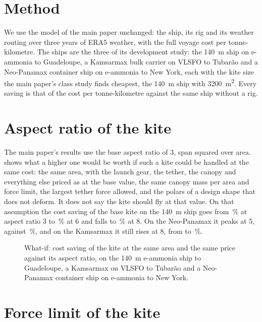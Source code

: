\documentclass[3p,times,authoryear]{elsarticle}
\begin{document}
\section{Method}
\label{sec:method}

We use the model of the main paper unchanged: the ship, its rig and its weather routing over three years of ERA5 weather, with the full voyage cost per tonne-kilometre. The ships are the three of its development study: the \SI{140}{m} ship on e-ammonia to Guadeloupe, a Kamsarmax bulk carrier on VLSFO to Tubarão and a Neo-Panamax container ship on e-ammonia to New York, each with the kite size the main paper's class study finds cheapest, the \SI{140}{m} ship with \SI{3200}{m^2}. Every saving is that of the cost per tonne-kilometre against the same ship without a rig.

\section{Aspect ratio of the kite}
\label{sec:aspect}

The main paper's results use the base aspect ratio of 3, span squared over area.  shows what a higher one would be worth if such a kite could be handled at the same cost: the same area, with the launch gear, the tether, the canopy and everything else priced as at the base value, the same canopy mass per area and force limit, the largest tether force allowed, and the polars of a design shape that does not deform. It does not say the kite should fly at that value. On that assumption the cost saving of the base kite on the \SI{140}{m} ship goes from \,\% at aspect ratio 3 to \,\% at 6 and falls to \,\% at 8. On the Neo-Panamax it peaks at 5,  against \,\%, and on the Kamsarmax it still rises at 8, from  to \,\%. 

\begin{figure}[tbp]
\centering
{}
\caption{What-if: cost saving of the kite at the same area and the same price against its aspect ratio, on the \SI{140}{m} e-ammonia ship to Guadeloupe, a Kamsarmax on VLSFO to Tubarão and a Neo-Panamax container ship on e-ammonia to New York.}
\label{fig:aspect}
\end{figure}

\section{Force limit of the kite}
\label{sec:force}
\end{document}
